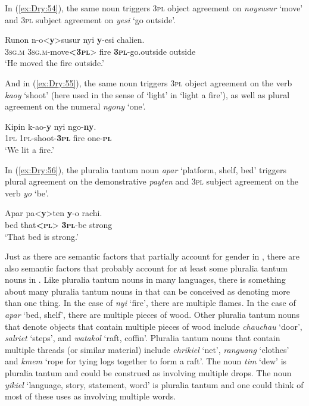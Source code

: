 \documentclass[output=collectionpaper]{langsci/langscibook}
\begin{document}
In (\ref{ex:Dry:54}), the same noun triggers \textsc{3pl} object agreement on \textit{noysusur} `move' and \textsc{3pl} subject agreement on \textit{yesi} `go outside'.

\ea \label{ex:Dry:54}
\gll Runon	n-o<\textbf{y}>susur	nyi	\textbf{y}-esi	chalien.\\
\textsc{3sg.m} \textsc{3sg.m}-move\textbf{<\textsc{3pl}}> fire \textbf{\textsc{3pl}}-go.outside outside\\
\glt `He moved the fire outside.'
\z

And in (\ref{ex:Dry:55}), the same noun triggers \textsc{3pl} object agreement on the verb \textit{kaoy} `shoot' (here used in the sense of `light' in `light a fire'), as well as plural agreement on the numeral \textit{ngony} `one'.

\ea \label{ex:Dry:55}
\gll Kipin	k-ao-\textbf{y}	nyi	ngo-\textbf{ny}.\\
\textsc{1pl} \textsc{1pl}-shoot-\textbf{\textsc{3pl}} fire one-\textbf{\textsc{pl}}\\
\glt `We lit a fire.'
\z

In (\ref{ex:Dry:56}), the pluralia tantum noun \textit{apar} `platform, shelf, bed' triggers plural agreement on the demonstrative \textit{payten} and \textsc{3pl} subject agreement on the verb \textit{yo} `be'.

\ea  \label{ex:Dry:56}
\gll Apar	pa<\textbf{y}>ten	\textbf{y}-o	rachi.\\
bed that\textbf{<\textsc{pl}}> \textbf{\textsc{3pl}}-be strong\\
\glt `That bed is strong.'
\z

Just as there are semantic factors that partially account for gender in , there are also semantic factors that probably account for at least some pluralia tantum nouns in . Like pluralia tantum nouns in many languages, there is something about many pluralia tantum nouns in  that can be conceived as denoting more than one thing. In the case of \textit{nyi} `fire', there are multiple flames. In the case of \textit{apar} `bed, shelf', there are multiple pieces of wood. Other pluralia tantum nouns that denote objects that contain multiple pieces of wood include \textit{chauchau} `door', \textit{salriet} `steps', and \textit{watakol} `raft, coffin'. Pluralia tantum nouns that contain multiple threads (or similar material) include \textit{chrikiel} `net', \textit{ranguang} `clothes' and \textit{kmem} `rope for tying logs together to form a raft'. The noun \textit{tim} `dew' is pluralia tantum and could be construed as involving multiple drops. The noun \textit{yikiel} `language, story, statement, word' is pluralia tantum and one could think of most of these uses as involving multiple words.
\end{document}
